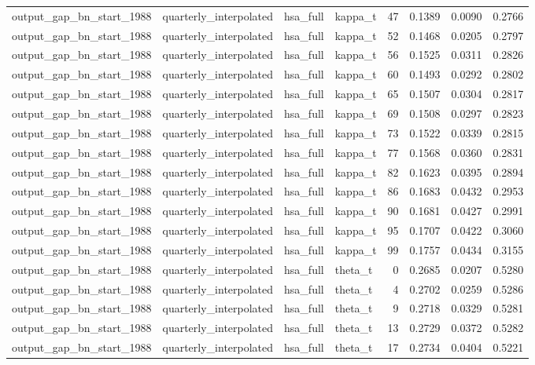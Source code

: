 \begin{tabular}{llllrrrr}
output\_gap\_bn\_start\_1988 & quarterly\_interpolated & hsa\_full & kappa\_t & 47 & 0.1389 & 0.0090 & 0.2766 \\
output\_gap\_bn\_start\_1988 & quarterly\_interpolated & hsa\_full & kappa\_t & 52 & 0.1468 & 0.0205 & 0.2797 \\
output\_gap\_bn\_start\_1988 & quarterly\_interpolated & hsa\_full & kappa\_t & 56 & 0.1525 & 0.0311 & 0.2826 \\
output\_gap\_bn\_start\_1988 & quarterly\_interpolated & hsa\_full & kappa\_t & 60 & 0.1493 & 0.0292 & 0.2802 \\
output\_gap\_bn\_start\_1988 & quarterly\_interpolated & hsa\_full & kappa\_t & 65 & 0.1507 & 0.0304 & 0.2817 \\
output\_gap\_bn\_start\_1988 & quarterly\_interpolated & hsa\_full & kappa\_t & 69 & 0.1508 & 0.0297 & 0.2823 \\
output\_gap\_bn\_start\_1988 & quarterly\_interpolated & hsa\_full & kappa\_t & 73 & 0.1522 & 0.0339 & 0.2815 \\
output\_gap\_bn\_start\_1988 & quarterly\_interpolated & hsa\_full & kappa\_t & 77 & 0.1568 & 0.0360 & 0.2831 \\
output\_gap\_bn\_start\_1988 & quarterly\_interpolated & hsa\_full & kappa\_t & 82 & 0.1623 & 0.0395 & 0.2894 \\
output\_gap\_bn\_start\_1988 & quarterly\_interpolated & hsa\_full & kappa\_t & 86 & 0.1683 & 0.0432 & 0.2953 \\
output\_gap\_bn\_start\_1988 & quarterly\_interpolated & hsa\_full & kappa\_t & 90 & 0.1681 & 0.0427 & 0.2991 \\
output\_gap\_bn\_start\_1988 & quarterly\_interpolated & hsa\_full & kappa\_t & 95 & 0.1707 & 0.0422 & 0.3060 \\
output\_gap\_bn\_start\_1988 & quarterly\_interpolated & hsa\_full & kappa\_t & 99 & 0.1757 & 0.0434 & 0.3155 \\
output\_gap\_bn\_start\_1988 & quarterly\_interpolated & hsa\_full & theta\_t & 0 & 0.2685 & 0.0207 & 0.5280 \\
output\_gap\_bn\_start\_1988 & quarterly\_interpolated & hsa\_full & theta\_t & 4 & 0.2702 & 0.0259 & 0.5286 \\
output\_gap\_bn\_start\_1988 & quarterly\_interpolated & hsa\_full & theta\_t & 9 & 0.2718 & 0.0329 & 0.5281 \\
output\_gap\_bn\_start\_1988 & quarterly\_interpolated & hsa\_full & theta\_t & 13 & 0.2729 & 0.0372 & 0.5282 \\
output\_gap\_bn\_start\_1988 & quarterly\_interpolated & hsa\_full & theta\_t & 17 & 0.2734 & 0.0404 & 0.5221 \\

\end{tabular}
